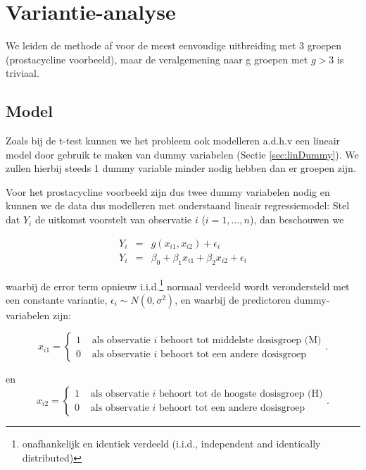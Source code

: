 \documentclass[
  12pt,dutch,coursenotes]{book}
\theoremstyle{definition}
\theoremstyle{definition}
\theoremstyle{definition}
\theoremstyle{definition}
\theoremstyle{remark}
\begin{document}
\hypertarget{variantie-analyse}{%
\section{Variantie-analyse}\label{variantie-analyse}}

We leiden de methode af voor de meest eenvoudige uitbreiding met 3 groepen (prostacycline voorbeeld), maar de veralgemening naar g groepen met \(g>3\) is triviaal.

\hypertarget{model-2}{%
\subsection{Model}\label{model-2}}

Zoals bij de t-test kunnen we het probleem ook modelleren a.d.h.v een lineair model door gebruik te maken van dummy variabelen (Sectie \ref{sec:linDummy}).
We zullen hierbij steeds 1 dummy variable minder nodig hebben dan er groepen zijn.

Voor het prostacycline voorbeeld zijn dus twee dummy variabelen nodig en kunnen we de data dus modelleren met onderstaand lineair regressiemodel:
Stel dat \(Y_i\) de uitkomst voorstelt van observatie \(i\) (\(i=1,\ldots, n\)), dan beschouwen we

\begin{eqnarray}
  Y_i &=& g(x_{i1},x_{i2}) + \epsilon_i\\
  Y_i &=& \beta_0+\beta_1 x_{i1} +\beta_2 x_{i2} +\epsilon_i \label{eq:regmu3}
\end{eqnarray}

waarbij de error term opnieuw i.i.d.\footnote{onafhankelijk en identiek verdeeld (i.i.d., independent and identically distributed)} normaal verdeeld wordt verondersteld met een constante variantie, \(\epsilon_i\sim N(0,\sigma^2)\), en waarbij de predictoren dummy-variabelen zijn:

\[x_{i1} = \left\{ \begin{array}{ll}
1 & \text{ als observatie $i$ behoort tot middelste dosisgroep (M)} \\
0 & \text{ als observatie $i$ behoort tot  een andere dosisgroep} \end{array}\right. .\]

en
\[x_{i2} = \left\{ \begin{array}{ll}
1 & \text{ als observatie $i$ behoort tot de hoogste dosisgroep (H)} \\
0 & \text{ als observatie $i$ behoort tot een andere dosisgroep} \end{array}\right. .\]
\end{document}
